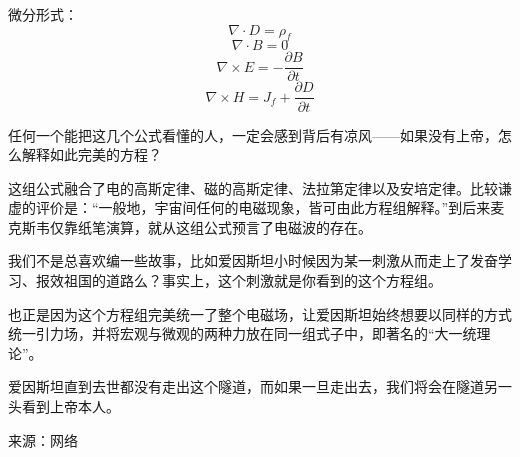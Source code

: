 微分形式：$$\nabla \cdot D=\rho_{f}$$
$$\nabla \cdot B=0$$
$$\nabla \times E=-\displaystyle\frac{\displaystyle\partial B}{\displaystyle\partial t}$$
$$\nabla \times H=J_f+\displaystyle\frac{\displaystyle\partial D}{\displaystyle\partial t}$$

任何一个能把这几个公式看懂的人，一定会感到背后有凉风——如果没有上帝，怎么解释如此完美的方程？

这组公式融合了电的高斯定律、磁的高斯定律、法拉第定律以及安培定律。比较谦虚的评价是：“一般地，宇宙间任何的电磁现象，皆可由此方程组解释。”到后来麦克斯韦仅靠纸笔演算，就从这组公式预言了电磁波的存在。

我们不是总喜欢编一些故事，比如爱因斯坦小时候因为某一刺激从而走上了发奋学习、报效祖国的道路么？事实上，这个刺激就是你看到的这个方程组。

也正是因为这个方程组完美统一了整个电磁场，让爱因斯坦始终想要以同样的方式统一引力场，并将宏观与微观的两种力放在同一组式子中，即著名的“大一统理论”。

爱因斯坦直到去世都没有走出这个隧道，而如果一旦走出去，我们将会在隧道另一头看到上帝本人。

来源：网络
